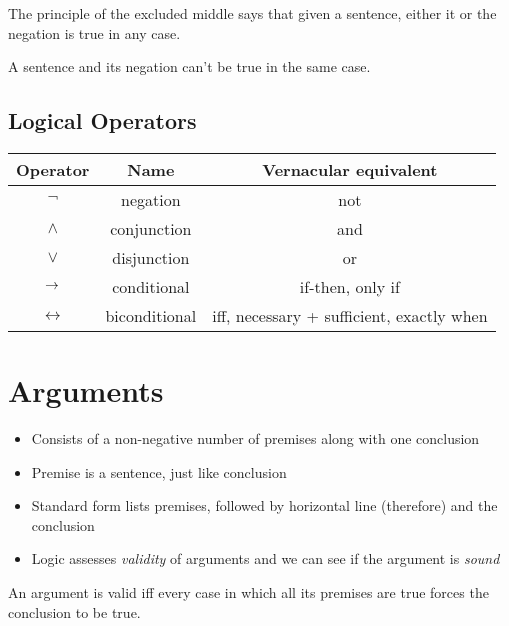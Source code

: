 \begin{axiom}
    The principle of the excluded middle says that given a sentence, either it or the negation is true in any case.
\end{axiom}

\begin{axiom}
    A sentence and its negation can't be true in the same case.
\end{axiom}

\subsection{Logical Operators}

\begin{center}
\begin{tabular}[]{|c|c|c|}
    Operator & Name & Vernacular equivalent\\
    \hline
    $\lnot$ & negation & not\\
    $\land$ & conjunction & and\\
    $\lor$ & disjunction & or\\
    $\rightarrow$ & conditional & if-then, only if\\
    $\leftrightarrow$ & biconditional & iff, necessary + sufficient, exactly when
\end{tabular}
\end{center}

\section{Arguments}

\begin{itemize}
    \item Consists of a non-negative number of premises along with one conclusion
    \item Premise is a sentence, just like conclusion
    \item Standard form lists premises, followed by horizontal line (therefore) and the conclusion
    \item Logic assesses \textit{validity} of arguments and we can see if the argument is \textit{sound}
\end{itemize}

\begin{definition}[Validity]
    An argument is valid iff every case in which all its premises are true forces the conclusion to be true.
\end{definition}

